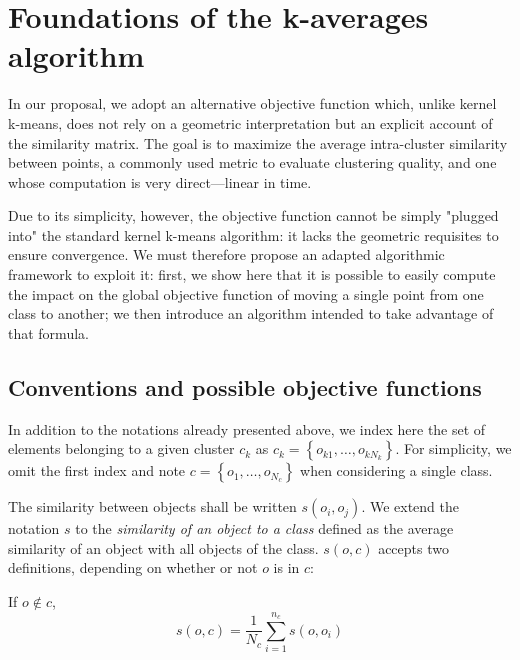 \documentclass[a4paper,twoside]{article}
\newcommand{\cad}{---} %
\begin{document}
\section{Foundations of the k-averages algorithm} \label{sec:kaverages}

In our proposal, we adopt an alternative objective function which, unlike kernel k-means, does not rely on a geometric interpretation but an explicit account of the similarity matrix. The goal is to maximize the average intra-cluster similarity between points, a commonly used metric to evaluate clustering quality, and one whose computation is very direct\cad{}linear in time.

Due to its simplicity, however, the objective function cannot be simply "plugged into" the standard kernel k-means algorithm: it lacks the geometric requisites to ensure convergence. We must therefore propose an adapted algorithmic framework to exploit it: first, we show here that it is possible to easily compute the impact on the global objective function of moving a single point from one class to another; we then introduce an algorithm intended to take advantage of that formula.

\subsection{Conventions and possible objective functions}

In addition to the notations already presented above, we index here the set of elements belonging to a given cluster $c_k$ as $c_k = \left\{o_{k1}, \ldots, o_{kN_k}\right\}$. 
For simplicity, we omit the first index and note $c = \left\{o_1, \ldots, o_{N_c}\right\}$ when considering a single class. 

The similarity between objects shall be written $s\left(o_i, o_j\right)$.
We extend the notation $s$ to the \emph{similarity of an object to a
  class} defined as the average similarity of an object
with all objects of the class. $s(o,c)$ accepts two definitions,
depending on whether or not $o$ is in $c$:

If $o \notin c$,
\begin{equation}
  s\left(o,c\right) = \frac{1}{N_c} \sum_{i=1}^{n_c}s\left(o, o_i\right)
   \label{eq:soc_notinclass}
\end{equation}
\end{document}
